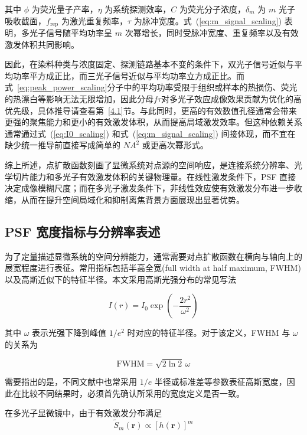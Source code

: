 其中 $\phi$ 为荧光量子产率，$\eta$ 为系统探测效率，$C$ 为荧光分子浓度，$\delta_m$ 为 $m$ 光子吸收截面，$f_{\mathrm{rep}}$ 为激光重复频率，$\tau$ 为脉冲宽度。式~(\ref{eq:m_signal_scaling}) 表明，多光子信号随平均功率呈 $m$ 次幂增长，同时受脉冲宽度、重复频率以及有效激发体积共同影响。

因此，在染料种类与浓度固定、探测链路基本不变的条件下，双光子信号近似与平均功率平方成正比，而三光子信号近似与平均功率立方成正比。而式~\ref{eq:peak_power_scaling}分子中的平均功率受限于组织或样本的热损伤、荧光的热漂白等影响无法无限增加，因此分母$f\tau$对多光子效应成像效果贡献为优化的高优先级，具体推导请查看第~\ref{4.1}节。与此同时，更高的有效数值孔径通常会带来更强的聚焦能力和更小的有效激发体积，从而提高局域激发效率。但这种依赖关系通常通过式~(\ref{eq:I0_scaling}) 和式~(\ref{eq:m_signal_scaling}) 间接体现，而不宜在缺少统一推导前直接写成简单的 $NA^2$ 或更高次幂形式。

综上所述，点扩散函数刻画了显微系统对点源的空间响应，是连接系统分辨率、光学切片能力和多光子有效激发体积的关键物理量。在线性激发条件下，PSF 直接决定成像模糊尺度；而在多光子激发条件下，非线性效应使有效激发分布进一步收缩，从而在提升空间局域化和抑制离焦背景方面展现出显著优势。



\subsection{PSF 宽度指标与分辨率表述}\label{2.2.2}
为了定量描述显微系统的空间分辨能力，通常需要对点扩散函数在横向与轴向上的展宽程度进行表征。常用指标包括半高全宽(full width at half maximum, FWHM)以及高斯近似下的特征半径。本文采用高斯光强分布的常见写法

\begin{equation}
  I(r)=I_0\exp\!\left(-\frac{2r^2}{\omega^2}\right)
  \label{eq:gaussian_width_def}
\end{equation}

其中 $\omega$ 表示光强下降到峰值 $1/e^2$ 时对应的特征半径。对于该定义，FWHM 与 $\omega$ 的关系为

\begin{equation}
  \mathrm{FWHM}=\sqrt{2\ln 2}\,\omega
  \label{eq:fwhm_omega_relation}
\end{equation}

需要指出的是，不同文献中也常采用 $1/e$ 半径或标准差等参数表征高斯宽度，因此在比较不同结果时，必须首先确认所采用的宽度定义是否一致。

在多光子显微镜中，由于有效激发分布满足
\begin{equation}
  \widetilde S_m(\mathbf r)\propto [h(\mathbf r)]^m
\end{equation}

